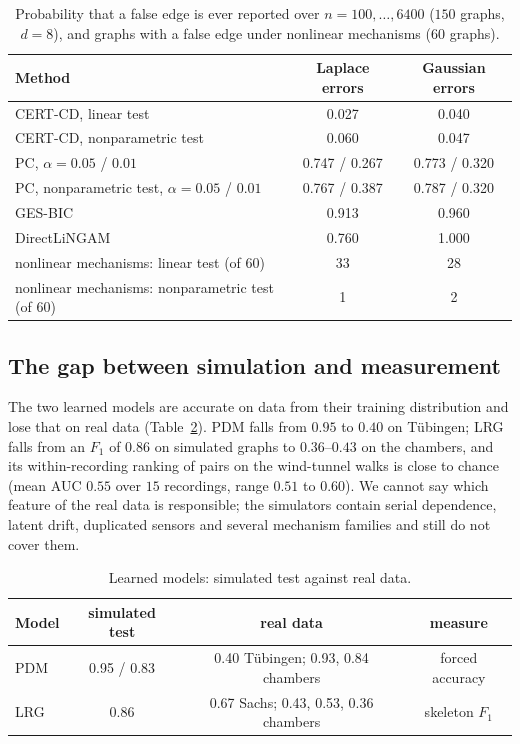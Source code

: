 \begin{table}[t]
\caption{Probability that a false edge is ever reported over $n=100,\dots,6400$ ($150$ graphs,
$d=8$), and graphs with a false edge under nonlinear mechanisms ($60$ graphs).}
\label{tab:monitoring}
\small
\begin{tabular}{@{}lcc@{}}
\toprule
Method & Laplace errors & Gaussian errors\\
\midrule
CERT-CD, linear test & 0.027 & 0.040\\
CERT-CD, nonparametric test & 0.060 & 0.047\\
PC, $\alpha=0.05$ / $0.01$ & 0.747 / 0.267 & 0.773 / 0.320\\
PC, nonparametric test, $\alpha=0.05$ / $0.01$ & 0.767 / 0.387 & 0.787 / 0.320\\
GES-BIC & 0.913 & 0.960\\
DirectLiNGAM & 0.760 & 1.000\\
\midrule
nonlinear mechanisms: linear test (of $60$) & 33 & 28\\
nonlinear mechanisms: nonparametric test (of $60$) & 1 & 2\\
\bottomrule
\end{tabular}
\end{table}

\subsection{The gap between simulation and measurement}\label{sec:gap}

The two learned models are accurate on data from their training distribution and lose that
on real data (Table~\ref{tab:gap}). PDM falls from $0.95$ to $0.40$ on Tübingen; LRG falls
from an $F_1$ of $0.86$ on simulated graphs to $0.36$--$0.43$ on the chambers, and its
within-recording ranking of pairs on the wind-tunnel walks is close to chance (mean AUC $0.55$ over $15$
recordings, range $0.51$ to $0.60$).
We cannot say which feature of the real data is responsible; the simulators contain serial
dependence, latent drift, duplicated sensors and several mechanism families and still do not
cover them.

\begin{table}[t]
\caption{Learned models: simulated test against real data.}
\label{tab:gap}
\small
\begin{tabular}{@{}lccc@{}}
\toprule
Model & simulated test & real data & measure\\
\midrule
PDM & 0.95 / 0.83 & 0.40 Tübingen; 0.93, 0.84 chambers & forced accuracy\\
LRG & 0.86 & 0.67 Sachs; 0.43, 0.53, 0.36 chambers & skeleton $F_1$\\
\bottomrule
\end{tabular}
\end{table}
